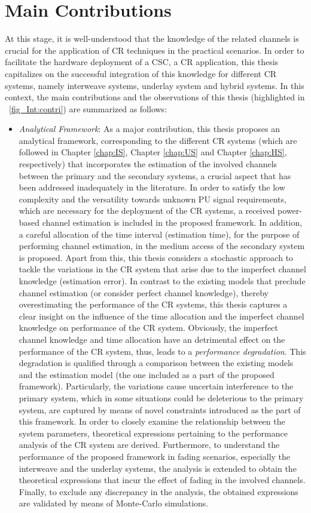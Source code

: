 \section{Main Contributions}
At this stage, it is well-understood that the knowledge of the related channels is crucial for the application of CR techniques in the practical scenarios. In order to facilitate the hardware deployment of a CSC, a CR application, this thesis capitalizes on the successful integration of this knowledge for different CR systems, namely interweave systems, underlay system and hybrid systems. In this context, the main contributions and the observations of this thesis (highlighted in \figurename~\ref{fig_Int:contri}) are summarized as follows:
\begin{itemize}
\item \textit{Analytical Framework}: 
As a major contribution, this thesis proposes an analytical framework, corresponding to the different CR systems (which are followed in Chapter \ref{chap:IS}, Chapter \ref{chap:US} and Chapter \ref{chap:HS}, respectively) that incorporates the estimation of the involved channels between the primary and the secondary systems, a crucial aspect that has been addressed inadequately in the literature. In order to satisfy the low complexity and the versatility towards unknown PU signal requirements, which are necessary for the deployment of the CR systems, a received power-based channel estimation is included in the proposed framework. In addition, a careful allocation of the time interval (estimation time), for the purpose of performing channel estimation, in the medium access of the secondary system is proposed. Apart from this, this thesis considers a stochastic approach to tackle the variations in the CR system that arise due to the imperfect channel knowledge (estimation error). In contrast to the existing models that preclude channel estimation (or consider perfect channel knowledge), thereby overestimating the performance of the CR systems, this thesis captures a clear insight on the influence of the time allocation and the imperfect channel knowledge on performance of the CR system. Obviously, the imperfect channel knowledge and time allocation have an detrimental effect on the performance of the CR system, thus, leads to a \textit{performance degradation}. This degradation is qualified through a comparison between the existing models and the estimation model (the one included as a part of the proposed framework). Particularly, the variations cause uncertain interference to the primary system, which in some situations could be deleterious to the primary system, are captured by means of novel constraints introduced as the part of this framework. In order to closely examine the relationship between the system parameters, theoretical expressions pertaining to the performance analysis of the CR system are derived. Furthermore, to understand the performance of the proposed framework in fading scenarios, especially the interweave and the underlay systems, the analysis is extended to obtain the theoretical expressions that incur the effect of fading in the involved channels. Finally, to exclude any discrepancy in the analysis, the obtained expressions are validated by means of Monte-Carlo simulations. 

\end{itemize}
